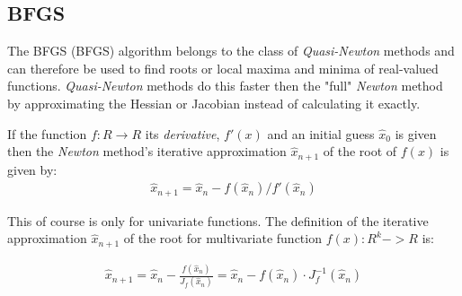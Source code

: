 \subsection{BFGS}\label{bfgs}
The \acl{BFGS} (\acs{BFGS}) algorithm belongs to the class of \textit{Quasi-Newton} methods and can therefore be used to find roots or local maxima and minima of real-valued functions. \textit{Quasi-Newton} methods do this faster then the "full" \textit{Newton} method by approximating the Hessian or Jacobian instead of calculating it exactly.

If the function $f: R \rightarrow R$ its \textit{derivative}, $f'(x)$ and an initial guess $\hat{x}_0$ is given then the \textit{Newton} method's iterative approximation $\hat{x}_{n+1}$ of the root of $f(x)$ is given by: 
\begin{equation}\label{eq:newtons_method_univariate}
	\begin{array}{c}
		\hat{x}_{n+1} = \hat{x}_{n} - f(\hat{x}_{n})/f'(\hat{x}_{n})
	\end{array}
\end{equation}
    







This of course is only for univariate functions. The definition of the iterative approximation $\hat{x}_{n+1}$ of the root for multivariate function $f(x): R^k -> R$ is:

\begin{equation}\label{eq:newtons_method_multivariate_root}
	\begin{array}{c}
		\hat{x}_{n+1} =\hat{x}_{n} - \frac{f(\hat{x}_{n})}{J_f(\hat{x}_{n})} = \hat{x}_{n} - f(\hat{x}_{n}) \cdot J_f^{-1}(\hat{x}_{n}) 
	\end{array}
\end{equation}

